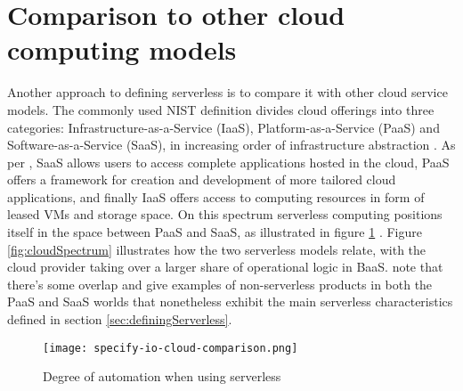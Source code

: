 \section{Comparison to other cloud computing models} \label{sec:comparisonCloud}


Another approach to defining serverless is to compare it with other cloud service models. The commonly used NIST definition \parencite{nist11definitions} divides cloud offerings into three categories: Infrastructure-as-a-Service (IaaS), Platform-as-a-Service (PaaS) and Software-as-a-Service (SaaS), in increasing order of infrastructure abstraction \parencite{nist11definitions}. As per \textcite{buyya2017manifesto}, SaaS allows users to access complete applications hosted in the cloud, PaaS offers a framework for creation and development of more tailored cloud applications, and finally IaaS offers access to computing resources in form of leased VMs and storage space. On this spectrum serverless computing positions itself in the space between PaaS and SaaS, as illustrated in figure \ref{fig:degreeOfAutomation} \parencite{baldini17currentTrends}. Figure \ref{fig:cloudSpectrum} illustrates how the two serverless models relate, with the cloud provider taking over a larger share of operational logic in BaaS. \textcite{van2017spec} note that there's some overlap and give examples of non-serverless products in both the PaaS and SaaS worlds that nonetheless exhibit the main serverless characteristics defined in section \ref{sec:definingServerless}.

\begin{figure}[h]
  \centering
  \texttt{[image: specify-io-cloud-comparison.png]}
  \caption{Degree of automation when using serverless \parencite{wolf16serverless}}
  \label{fig:degreeOfAutomation}
\end{figure}

